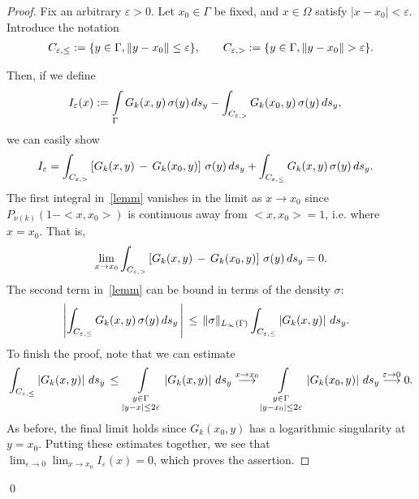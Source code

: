 \begin{proof}
Fix an arbitrary $\varepsilon > 0$. Let $x_0 \in \Gamma$ be fixed, and
$x \in \Omega$ satisfy $|x-x_0| < \varepsilon$.  Introduce the notation 
\begin{align*}
  C_{\e,\leq}:=\{y \in \Gamma,\|y-x_0\|\leq\e\},\qquad  
  C_{\e,>}:=\{y\in \Gamma,\|y-x_0\|>\e\}.
\end{align*}

Then, if we define
\begin{align*}
  I_{\varepsilon}(x) &: = \int\limits_\Gamma G_k(x,y)
  \,\sigma(y) \,ds_{y} - \int_{C_{\varepsilon,>}} G_k(x_0,y)
  \,\sigma(y)\,ds_{y},
\end{align*} 
we can easily show
\begin{align}
  I_{\varepsilon}& =  \int_{C_{\varepsilon,>}}
  \left[ G_k(x,y)\,-\, G_k(x_0,y) \right]\,\sigma(y)\,ds_{y} +    
    \int_{C_{\varepsilon,\leq}} G_k(x,y)\, \sigma(y)\, ds_{y}.
  \label{lemm}
\end{align}
The first integral in~\eqref{lemm} vanishes in the limit as
$x\rightarrow x_0$ since $P_{\nu(k)}(1-<x,x_0>)$ is continuous away from
$<x,x_0>=1$, i.e. where $x=x_0$.  That is, 
\begin{align*}
  \lim\limits_{x \to x_0} \int_{C_{\varepsilon,>}}
  \left[G_k(x,y)\,-\,G_k(x_0,y) \right]\,\sigma(y)\,ds_{y} = 0 .
\end{align*}
The second term in~\eqref{lemm} can be bound in terms of the density
$\sigma$:
\begin{align*}
  &\left|\int_{C_{\varepsilon,\leq}}
  G_k(x,y)\,\sigma(y)\,ds_{y}\,\right| \, \leq \,
  \| \sigma \|_{L_\infty(\Gamma)} \int_{C_{\varepsilon,\leq}}
  \left| G_k(x,y)\right|\,ds_{y}.
\end{align*}
To finish the proof, note that we can estimate
\begin{align*}
  \int_{C_{\e,\leq}} \left| G_k(x,y)\right|\,ds_{y}\,\leq\,
  \int\limits_{\substack{y \in \Gamma \\ |y-x| \leq 2\varepsilon}}
  \left| G_k(x,y)\right|\,ds_{y}
  \buildrel {x\rightarrow x_{0}}\over\longrightarrow 
  \int\limits_{\substack{y \in \Gamma \\ |y-x_{0}| \leq 2\varepsilon}}
  \left| G_k(x_0,y)\right|\,ds_{y}
  \buildrel{\varepsilon\rightarrow 0}\over\longrightarrow 0.
\end{align*}
As before, the final limit holds since $G_{k}(x_{0},y)$ has a
logarithmic singularity at $y = x_{0}$.  Putting these estimates
together, we see that  $\displaystyle \lim_{\varepsilon\rightarrow
0}\lim_{x\rightarrow x_{0}} I_{\varepsilon}(x)=0$, which proves the
assertion.
\end{proof}
\qed


